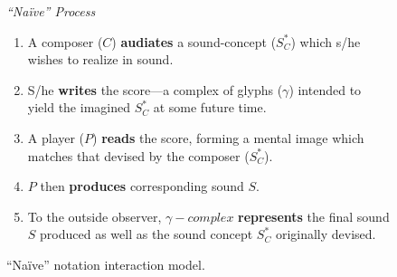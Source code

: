         \begin{figure}[H]
            \centering
                
                \begin{smallquote}
                    \begin{center}
                        \textit{``Naïve'' Process}
                    \end{center}
                
                    \begin{enumerate}
                        \item A composer ($C$) \textbf{audiates} a sound-concept ($S^*_C$) which s/he wishes to realize in sound.
                        \item S/he \textbf{writes} the score---a complex of glyphs ($\gamma$) intended to yield the imagined $S^*_C$ at some future time.
                        \item A player ($P$) \textbf{reads} the score, forming a mental image which matches that devised by the composer ($S^*_C$).
                        \item $P$ then \textbf{produces} corresponding sound $S$.
                        \item To the outside observer, $\gamma-complex$ \textbf{represents} the final sound $S$ produced as well as the sound concept $S^*_C$ originally devised.
                    \end{enumerate}
                \end{smallquote}

            \captionsetup{width=.5\textwidth}
            \caption{``Naïve'' notation interaction model.}
            \label{fig:naïvediagram}
        \end{figure}


